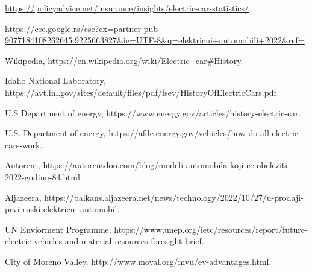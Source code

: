 \documentclass[a4paper]{article}
\begin{document}
\newpage
{}
\appendix

\begin{thebibliography}{10}

\url{https://policyadvice.net/insurance/insights/electric-car-statistics/}

 \url{https://cse.google.rs/cse?cx=partner-pub-9077184108262645:9225663827&ie=UTF-8&q=elektricni+automobili+2022&ref=}

Wikipedia,
https://en.wikipedia.org/wiki/Electric\_car#History.

Idaho National Laboratory,
https://avt.inl.gov/sites/default/files/pdf/fsev/HistoryOfElectricCars.pdf

U.S Department of energy,
https://www.energy.gov/articles/history-electric-car.

U.S. Department of energy,
https://afdc.energy.gov/vehicles/how-do-all-electric-cars-work.

Autorent,
https://autorentdoo.com/blog/modeli-automobila-koji-ce-obeleziti-2022-godinu-84.html.

Aljazeera,
https://balkans.aljazeera.net/news/technology/2022/10/27/u-prodaji-prvi-ruski-elektricni-automobil.

UN Enviorment Programme, https://www.unep.org/ietc/resources/report/future-electric-vehicles-and-material-resources-foresight-brief.

City of Moreno Valley,
http://www.moval.org/mvu/ev-advantages.html.

\end{thebibliography}
\end{document}
